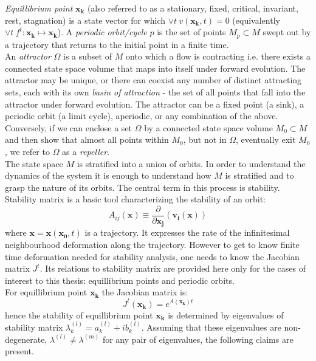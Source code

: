 \documentclass[../main.tex]{subfiles}
\begin{document}
\emph{Equillibrium point} $\mathbf{x_k}$ (also referred to as a stationary, fixed, critical, invariant, rest, stagnation)  is a state vector for which $\vee t \ v(\mathbf{x_k},t)=0$ (equivalently $\vee t \ f^t : \mathbf{x_k} \mapsto \mathbf{x_k}$). A \emph{periodic orbit/cycle} $p$ is the set of points $M_p \subset M$ swept out by a trajectory that returns to the initial point in a finite time.\\
 An \emph{attractor} $\Omega$ is a subset of $M$ onto which a flow is contracting i.e. there exists a connected state space volume that maps into itself under forward evolution. The attractor may be unique, or there can coexist any number of distinct attracting sets, each with its own \emph{basin of attraction} - the set of all points that fall into the attractor under
forward evolution. The attractor can be a fixed point (a sink), a periodic orbit (a limit cycle), aperiodic, or any combination of the above. Conversely, if we can enclose a set $\Omega$ by a connected state space volume $M_0 \subset M$ and then show that almost all points within $M_0$, but not in $\Omega$, eventually exit $M_0$, we refer to $\Omega$ as a \emph{repeller}.\\
The state space $M$ is stratified into a union of orbits. In order to understand the dynamics of the system it is enough to understand how $M$ is stratified and to grasp the nature of its orbits. The central term in this process is stability. Stability matrix is a basic tool characterizing the stability of an orbit:
\begin{equation}
A_{ij}(\mathbf{x})\equiv \frac{\partial}{\partial \mathbf{x_j}}(\mathbf{v_i}(\mathbf{x}))
\label{def:stab_mat}
\end{equation}
where $\mathbf{x}=\mathbf{x}(\mathbf{x_0},t)$ is a trajectory. It expresses the rate of the infinitesimal neighbourhood deformation along the trajectory. However to get to know finite time deformation needed for stability analysis, one needs to know the Jacobian matrix $J^t$. Its relations to stability matrix are provided here only for the cases of interest to this thesis: equillibrium points and periodic orbits.\\
For equillibrium point $\mathbf{x_k}$ the Jacobian matrix is:
\begin{equation}
J^t(\mathbf{x_k})=e^{A(\mathbf{x_k})t}
\label{def:Jacobian}
\end{equation}
hence the stability of equillibrium point $\mathbf{x_k}$ is determined by eigenvalues of stability matrix $\lambda^{(l)}_k=a^{(l)}_k+ib^{(l)}_k$. Assuming
that these eigenvalues are non-degenerate, $\lambda^{(l)} \neq \lambda^{(m)}$ for any pair of eigenvalues, the following claims are present.
\end{document}
